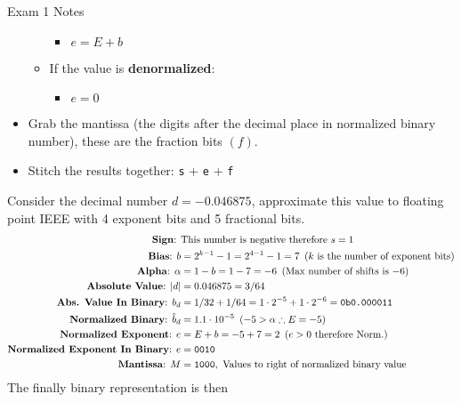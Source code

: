 \begin{examnotes}{Exam 1 Notes}
\begin{highlight}
\begin{itemize}
\begin{itemize}
                \begin{itemize}
                    \item $e = E + b$
                \end{itemize}
                \item If the value is \textbf{denormalized}:
                \begin{itemize}
                    \item $e = 0$
                \end{itemize}
            \end{itemize}
            \item Grab the mantissa (the digits after the decimal place in normalized binary number), these are the fraction bits $(f)$.
            \item Stitch the results together: \texttt{s} + \texttt{e} + \texttt{f}
        \end{itemize}
    \end{highlight}

    \begin{highlight}
        Consider the decimal number $d = -0.046875$, approximate this value to floating point IEEE with 4 exponent bits and 5 fractional bits.
        \begin{align*}
            \text{\textbf{Sign}: } & \text{This number is negative therefore } s = 1 \\
            \text{\textbf{Bias}: } b & = 2^{k - 1} - 1 = 2^{4 - 1} - 1 = 7 \hspace*{5pt} \text{($k$ is the number of exponent bits)} \\
            \text{\textbf{Alpha}: } \alpha & = 1 - b = 1 - 7 = -6 \hspace*{5pt} \text{(Max number of shifts is $-6$)} \\
            \text{\textbf{Absolute Value}: } |d| & = 0.046875 = 3 / 64 \\
            \text{\textbf{Abs. Value In Binary}: } b_{d} & = 1 / 32 + 1 / 64 = 1 \cdot 2^{-5} + 1 \cdot 2^{-6} = \texttt{0b0.000011} \\
            \text{\textbf{Normalized Binary}: } \hat{b}_{d} & = 1.1 \cdot 10^{-5} \hspace*{5pt} \text{($-5 > \alpha \therefore E = -5$)} \\
            \text{\textbf{Normalized Exponent}: } e & = E + b = -5 + 7 = 2 \hspace*{5pt} \text{($e > 0$ therefore Norm.)} \\
            \text{\textbf{Normalized Exponent In Binary}: } e & = \texttt{0010} \\
            \text{\textbf{Mantissa}: } M & = \texttt{1000}, \text{ Values to right of normalized binary value}
        \end{align*}
        The finally binary representation is then


\end{highlight}
\end{examnotes}

